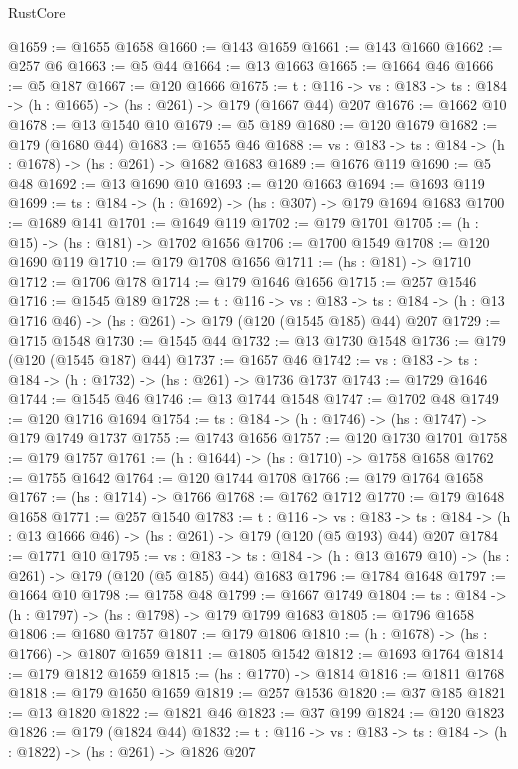 \begin{lexlean}{RustCore}
\begin{coremodule}
@1659 := @1655 @1658
@1660 := @143 @1659
@1661 := @143 @1660
@1662 := @257 @6
@1663 := @5 @44
@1664 := @13 @1663
@1665 := @1664 @46
@1666 := @5 @187
@1667 := @120 @1666
@1675 := {t : @116} ->
  {vs : @183} -> {ts : @184} -> (h : @1665) -> (hs : @261) -> @179 (@1667 @44) @207
@1676 := @1662 @10
@1678 := @13 @1540 @10
@1679 := @5 @189
@1680 := @120 @1679
@1682 := @179 (@1680 @44)
@1683 := @1655 @46
@1688 := {vs : @183} -> {ts : @184} -> (h : @1678) -> (hs : @261) -> @1682 @1683
@1689 := @1676 @119
@1690 := @5 @48
@1692 := @13 @1690 @10
@1693 := @120 @1663
@1694 := @1693 @119
@1699 := {ts : @184} -> (h : @1692) -> (hs : @307) -> @179 @1694 @1683
@1700 := @1689 @141
@1701 := @1649 @119
@1702 := @179 @1701
@1705 := (h : @15) -> (hs : @181) -> @1702 @1656
@1706 := @1700 @1549
@1708 := @120 @1690 @119
@1710 := @179 @1708 @1656
@1711 := (hs : @181) -> @1710
@1712 := @1706 @178
@1714 := @179 @1646 @1656
@1715 := @257 @1546
@1716 := @1545 @189
@1728 := {t : @116} ->
  {vs : @183} ->
  {ts : @184} -> (h : @13 @1716 @46) -> (hs : @261) -> @179 (@120 (@1545 @185) @44) @207
@1729 := @1715 @1548
@1730 := @1545 @44
@1732 := @13 @1730 @1548
@1736 := @179 (@120 (@1545 @187) @44)
@1737 := @1657 @46
@1742 := {vs : @183} -> {ts : @184} -> (h : @1732) -> (hs : @261) -> @1736 @1737
@1743 := @1729 @1646
@1744 := @1545 @46
@1746 := @13 @1744 @1548
@1747 := @1702 @48
@1749 := @120 @1716 @1694
@1754 := {ts : @184} -> (h : @1746) -> (hs : @1747) -> @179 @1749 @1737
@1755 := @1743 @1656
@1757 := @120 @1730 @1701
@1758 := @179 @1757
@1761 := (h : @1644) -> (hs : @1710) -> @1758 @1658
@1762 := @1755 @1642
@1764 := @120 @1744 @1708
@1766 := @179 @1764 @1658
@1767 := (hs : @1714) -> @1766
@1768 := @1762 @1712
@1770 := @179 @1648 @1658
@1771 := @257 @1540
@1783 := {t : @116} ->
  {vs : @183} -> {ts : @184} -> (h : @13 @1666 @46) -> (hs : @261) -> @179 (@120 (@5 @193) @44) @207
@1784 := @1771 @10
@1795 := {vs : @183} ->
  {ts : @184} -> (h : @13 @1679 @10) -> (hs : @261) -> @179 (@120 (@5 @185) @44) @1683
@1796 := @1784 @1648
@1797 := @1664 @10
@1798 := @1758 @48
@1799 := @1667 @1749
@1804 := {ts : @184} -> (h : @1797) -> (hs : @1798) -> @179 @1799 @1683
@1805 := @1796 @1658
@1806 := @1680 @1757
@1807 := @179 @1806
@1810 := (h : @1678) -> (hs : @1766) -> @1807 @1659
@1811 := @1805 @1542
@1812 := @1693 @1764
@1814 := @179 @1812 @1659
@1815 := (hs : @1770) -> @1814
@1816 := @1811 @1768
@1818 := @179 @1650 @1659
@1819 := @257 @1536
@1820 := @37 @185
@1821 := @13 @1820
@1822 := @1821 @46
@1823 := @37 @199
@1824 := @120 @1823
@1826 := @179 (@1824 @44)
@1832 := {t : @116} -> {vs : @183} -> {ts : @184} -> (h : @1822) -> (hs : @261) -> @1826 @207

\end{coremodule}
\end{lexlean}
